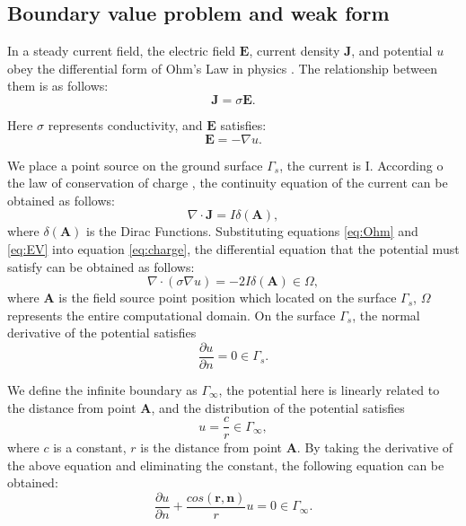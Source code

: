 \documentclass[extra, referee]{gji}
\begin{document}
\subsection{Boundary value problem and weak form}
In a steady current field, the electric field $\mathbf{E}$, current density
$\mathbf{J}$, and potential $u$ obey the differential form of Ohm's Law in
physics \citep{Kaufman2014,Kovaevi2022}. The relationship between them is as
follows:
\begin{equation}
  \label{eq:Ohm}
  \mathbf{J}=\sigma \mathbf{E}.
\end{equation}

Here $\sigma$ represents conductivity, and $\mathbf{E}$ satisfies:
\begin{equation}
  \label{eq:EV}
  \mathbf{E}=-\nabla u.
\end{equation}

We place a point source on the ground surface $\Gamma_s$, the current is I.
According o the law of conservation of charge \citep{Horndeski1976,OConnor2022},
the continuity equation of the current can be obtained as follows:
\begin{equation}
  \label{eq:charge}
  \nabla \cdot \mathbf{J}=I \delta( \mathbf{A}),
\end{equation}
where $\delta(\mathbf{A})$ is the Dirac Functions. Substituting equations
\ref{eq:Ohm} and \ref{eq:EV} into equation \ref{eq:charge}, the differential
equation that the potential must satisfy can be obtained as follows:
\begin{equation}
  \label{eq:fist}
  \nabla \cdot (\sigma\nabla u ) = -2 I \delta( \mathbf{A}) \in \Omega,
\end{equation}
where $\mathbf{A}$ is the field source point position which located on the
surface $\Gamma_s$, $ \Omega$ represents the entire computational domain. On the
surface $\Gamma_s$, the normal derivative of the potential satisfies
\begin{equation}
  \label{eq:second}
  \frac{\partial{u}}{\partial{n}}=0 \in \Gamma_s.
\end{equation}

We define the infinite boundary as $\Gamma_\infty$, the potential here is
linearly related to the distance from point $\mathbf{A}$, and the distribution
of the potential satisfies
\begin{equation}
  \label{eq:third}
  u=\frac{c}{r}\in \Gamma_\infty,
\end{equation}
where $c$ is a constant, $r$ is the distance from point $\mathbf{A}$. By taking
the derivative of the above equation and eliminating the constant, the following
equation can be obtained:
\begin{equation}
  \label{eq:forth}
  \frac{\partial{u}}{\partial{n}}+\frac{cos(\mathbf{r}, \mathbf{n})}{r}u=0\in \Gamma_\infty.
\end{equation}
\end{document}
